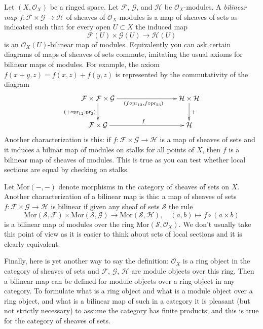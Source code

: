 \documentclass{stacks-project}
\theoremstyle{plain}
\theoremstyle{definition}
\theoremstyle{remark}
\numberwithin{equation}{subsection}
\begin{document}
\noindent
Let $(X, \mathcal{O}_X)$ be a ringed space.
Let $\mathcal{F}$, $\mathcal{G}$, and $\mathcal{H}$ be $\mathcal{O}_X$-modules.
A {\it bilinear map} $f : \mathcal{F} \times \mathcal{G} \to \mathcal{H}$
of sheaves of $\mathcal{O}_X$-modules is a map of sheaves of sets as indicated
such that for every open $U \subset X$ the induced map
$$
\mathcal{F}(U) \times \mathcal{G}(U) \to \mathcal{H}(U)
$$
is an $\mathcal{O}_X(U)$-bilinear map of modules. Equivalently you can ask
certain diagrams of maps of sheaves of sets commute, imitating the usual
axioms for bilinear maps of modules. For example, the axiom
$f(x + y, z) = f(x, z) + f(y, z)$ is represented by the commutativity
of the diagram
$$
\xymatrix{
\mathcal{F} \times \mathcal{F} \times \mathcal{G}
\ar[rrr]_{(f \circ \text{pr}_{13}, f \circ \text{pr}_{23})}
\ar[d]_{(+ \circ \text{pr}_{12}, \text{pr}_3)} & & &
\mathcal{H} \times \mathcal{H}
\ar[d]^{+} \\
\mathcal{F} \times \mathcal{G} \ar[rrr]^f & & &
\mathcal{H}
}
$$
Another characterization is this: if
$f : \mathcal{F} \times \mathcal{G} \to \mathcal{H}$
is a map of sheaves of sets and
it induces a bilinar map of modules on stalks for all points of $X$, then
$f$ is a bilinear map of sheaves of modules. This is true as you can test
whether local sections are equal by checking on stalks.

\medskip\noindent
Let $\text{Mor}( - , - )$ denote morphisms in the category of sheaves of
sets on $X$. Another characterization of a bilinear map is this:
a map of sheaves of sets
$f : \mathcal{F} \times \mathcal{G} \to \mathcal{H}$
is bilinear if given any sheaf of sets $\mathcal{S}$ the rule
$$
\text{Mor}(\mathcal{S}, \mathcal{F}) \times
\text{Mor}(\mathcal{S}, \mathcal{G}) \to
\text{Mor}(\mathcal{S}, \mathcal{H}),\quad
(a, b) \mapsto f \circ (a \times b)
$$
is a bilinear map of modules over the ring
$\text{Mor}(\mathcal{S}, \mathcal{O}_X)$.
We don't usually take this point of view as it is easier to think about
sets of local sections and it is clearly equivalent.

\medskip\noindent
Finally, here is yet another way to say the definition:
$\mathcal{O}_X$ is a ring object in the category of sheaves of sets
and $\mathcal{F}$, $\mathcal{G}$, $\mathcal{H}$ are module objects
over this ring. Then a bilinear map can be defined for module objects
over a ring object in any category.
To formulate what is a ring object and what is a module object
over a ring object, and what is a bilinear map of such in a
category it is pleasant (but not strictly necessary)
to assume the category has finite products; and
this is true for the category of sheaves of sets.
\end{document}
